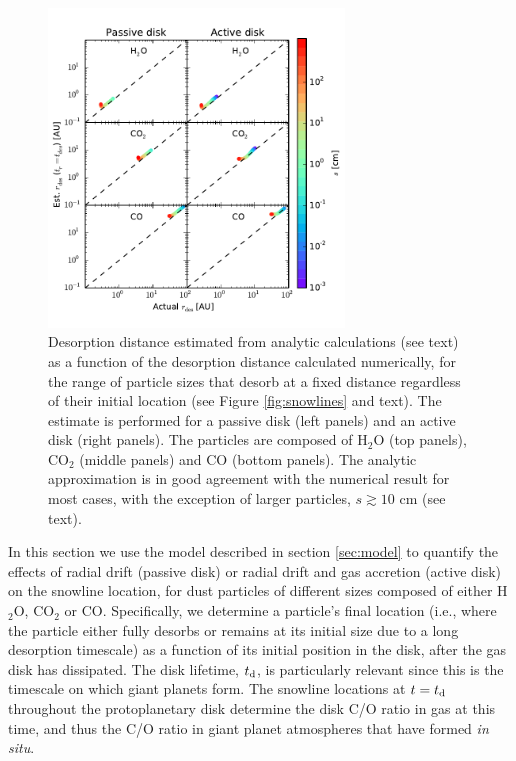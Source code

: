 \documentclass[apj]{emulateapj}
\begin{document}
\begin{figure}[t!]
\centering
\includegraphics[width=0.7\textwidth]{desorption_distance_actual_vs_estimated_passive_active_new.pdf}
\caption{Desorption distance estimated from analytic calculations (see text) as a function of the desorption distance calculated numerically, for the range of particle sizes that desorb at a fixed distance regardless of their initial location (see Figure \ref{fig:snowlines} and text). The estimate is performed for a passive disk (left panels) and an active disk (right panels).  The particles are composed of H$_2$O (top panels), CO$_2$ (middle panels) and CO (bottom panels). The analytic approximation is in good agreement with the numerical result for most cases, with the exception of larger particles, $s \gtrsim 10$ cm (see text).}
\label{fig:an_vs_actual}
\end{figure}

In this section we use the model described in section \ref{sec:model} to quantify the effects of radial drift (passive disk) or radial drift and gas accretion (active disk) on the snowline location, for dust particles of different sizes composed of either H$_2$O, CO$_2$ or CO. Specifically, we determine a particle's final location (i.e., where the particle either fully desorbs or remains at its initial size due to a long desorption timescale) as a function of its initial position in the disk, after the gas disk has dissipated. The disk lifetime, $t_{\rm d}$, is particularly relevant since this is the timescale on which giant planets form. The snowline locations at $t=t_{\rm d}$ throughout the protoplanetary disk determine the disk C/O ratio in gas at this time, and thus the C/O ratio in giant planet atmospheres that have formed \textit{in situ}.   
\end{document}
